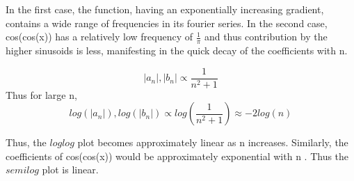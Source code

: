 \documentclass{article}
\begin{document}
\vspace{2mm}
In the first case, the function, having an exponentially increasing gradient,
contains a wide range of frequencies in its fourier series. In the second case,
cos(cos(x)) has a relatively low frequency of $\frac{1}{\pi}$
and thus contribution by
the higher sinusoids is less, manifesting in the quick decay of the coefficients
with n.


\begin{equation}
|a_{n}|, |b_{n}| \propto \frac{1}{n^2 + 1}   
\end{equation}
Thus for large n,
\begin{equation}
log(|a_{n}|), log(|b_{n}|) \propto log(\frac{1}{n^2 + 1}) \approx -2log(n)
\end{equation}

Thus, the $loglog$ plot becomes approximately linear as n increases.
Similarly, the coefficients of cos(cos(x)) would be approximately exponential
with n . Thus the $semilog$ plot is linear.

\vspace{5mm}
\end{document}

